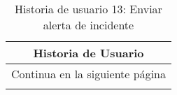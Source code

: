 

\begin{longtable}{|p{6.7cm}|p{6.7cm}|}
    \caption{Historia de usuario 13: Enviar alerta de incidente} \label{tab:historia-13}
    \\
    \hline
    \multicolumn{2}{|c|}{\textbf{Historia de Usuario}}                                                                                                                      \\
    \hline

    \endfirsthead

    \hline
    \endhead

    \hline
    \multicolumn{2}{|c|}{{Continua en la siguiente página}}                                                                                                                 \\
    \hline
    \endfoot

    \hline
    \endlastfoot


\end{longtable}
